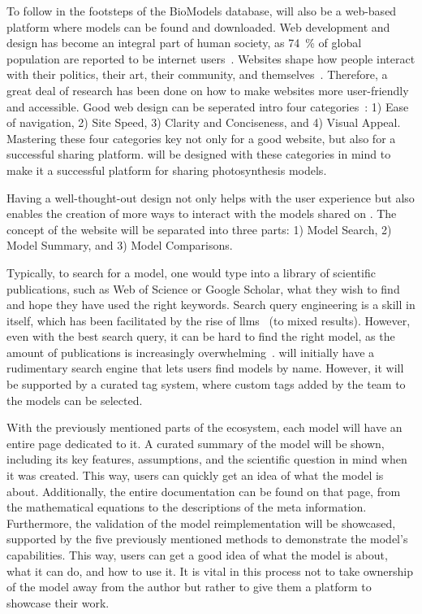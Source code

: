 To follow in the footsteps of the BioModels database, \greensloth{} will also be a web-based platform where models can be found and downloaded. Web development and design has become an integral part of human society, as \qty{74}{\percent} of global population are reported to be internet users~\cite{MeasuringDigitalDevelopment}. Websites shape how people interact with their politics, their art, their community, and themselves~\cite{DataReportalGlobalDigital}. Therefore, a great deal of research has been done on how to make websites more user-friendly and accessible. Good web design can be seperated intro four categories~\cite{nawirImpactWebsiteUsability2024}: 1) Ease of navigation, 2) Site Speed, 3) Clarity and Conciseness, and 4) Visual Appeal. Mastering these four categories key not only for a good website, but also for a successful sharing platform. \greensloth{} will be designed with these categories in mind to make it a successful platform for sharing photosynthesis models.

Having a well-thought-out design not only helps with the user experience but also enables the creation of more ways to interact with the models shared on \greensloth{}. The concept of the website will be separated into three parts: 1) Model Search, 2) Model Summary, and 3) Model Comparisons.

Typically, to search for a model, one would type into a library of scientific publications, such as Web of Science or Google Scholar, what they wish to find and hope they have used the right keywords. Search query engineering is a skill in itself, which has been facilitated by the rise of \glspl{llm}~\cite{baysanLLMasaJudgeAutomatedEvaluation2025} (to mixed results). However, even with the best search query, it can be hard to find the right model, as the amount of publications is increasingly overwhelming~. \greensloth{} will initially have a rudimentary search engine that lets users find models by name. However, it will be supported by a curated tag system, where custom tags added by the \greensloth{} team to the models can be selected.

With the previously mentioned parts of the \greensloth{} ecosystem, each model will have an entire page dedicated to it. A curated summary of the model will be shown, including its key features, assumptions, and the scientific question in mind when it was created. This way, users can quickly get an idea of what the model is about. Additionally, the entire documentation can be found on that page, from the mathematical equations to the descriptions of the meta information. Furthermore, the validation of the model reimplementation will be showcased, supported by the five previously mentioned methods to demonstrate the model's capabilities. This way, users can get a good idea of what the model is about, what it can do, and how to use it. It is vital in this process not to take ownership of the model away from the author but rather to give them a platform to showcase their work.

